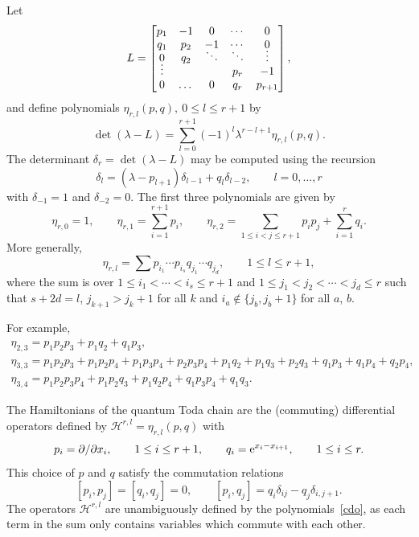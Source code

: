 \documentclass[pdftex]{sigma}
\theoremstyle{definition}
\renewcommand\H{{\mathcal H}}
\begin{document}
Let
\begin{equation}\label{lax}
L=\begin{bmatrix} p_1 & -1 & 0 & \cdots & 0\\
q_1 & p_2 & -1 & \cdots & 0\\
0 & q_2 & \smash{\ddots} & \smash{\ddots} & \smash{\vdots}\\
\smash{\vdots}&&&p_r&-1\\
0&\dots&0&q_r &p_{r+1} \end{bmatrix},
\end{equation}
and define polynomials $\eta_{r,l}(p,q),\ 0\le l\le r+1$ by
\[\det(\lambda-L) = \sum_{l=0}^{r+1} (-1)^l \lambda^{r-l+1} \eta_{r,l}(p,q).\]
The determinant $\delta_{r}=\det(\lambda-L)$ may be computed using the recursion
\[\delta_l=(\lambda-p_{l+1}) \delta_{l-1} + q_{l} \delta_{l-2},\qquad l=0,\dots,r\]
with $\delta_{-1}=1$ and $\delta_{-2}=0$. The first three polynomials are given by
\[\eta_{r,0}=1,\qquad
\eta_{r,1}=\sum_{i=1}^{r+1} p_i, \qquad
\eta_{r,2}=\sum_{1\le i<j \le r+1} p_i p_j + \sum_{i=1}^r q_i.\]
More generally,
\begin{equation}\label{cdo}
\eta_{r,l} = \sum p_{i_1}\cdots p_{i_s} q_{j_1}\cdots q_{j_d}, \qquad 1\le l\le r+1, \end{equation}
where the sum is over $1\le i_1 < \cdots < i_s \le r+1$
and $1\le j_1< j_2<\cdots < j_d\le r$ such that $s+2d=l$,
$j_{k+1}>j_k+1$ for all $k$ and
$i_a \notin \{j_b,j_b+1\}$ for all $a$, $b$.

For example,
\begin{gather*}
\eta_{2,3}=p_1 p_2 p_3 + p_1 q_2 + q_1 p_3,\\
\eta_{3,3} = p_1p_2p_3+p_1p_2p_4+p_1p_3p_4+p_2p_3p_4
 + p_1q_2+p_1q_3+p_2q_3+q_1p_3+q_1p_4+q_2p_4,\\
\eta_{3,4}=p_1p_2p_3p_4+p_1p_2q_3+p_1q_2p_4+q_1p_3p_4+q_1q_3.
\end{gather*}

The Hamiltonians of the quantum Toda chain are the (commuting) differential operators
defined by $\H^{r,l}=\eta_{r,l}(p,q)$ with
\begin{equation}\label{pq-def}
p_i=\partial/\partial x_i,\qquad 1\le i \le r+1,\qquad q_i={\rm e}^{x_{i}-x_{i+1}},\qquad 1\le i\le r.
\end{equation}
This choice of $p$ and $q$ satisfy the commutation relations
\begin{equation}\label{cr}
[p_i,p_j]=[q_i,q_j]=0,\qquad [p_i,q_j]=q_i\delta_{ij}-q_j\delta_{i,j+1}.\end{equation}
The operators $\H^{r,l}$ are unambiguously defined
by the polynomials~\eqref{cdo}, as each term in the sum
only contains variables which commute with each other.
\end{document}
